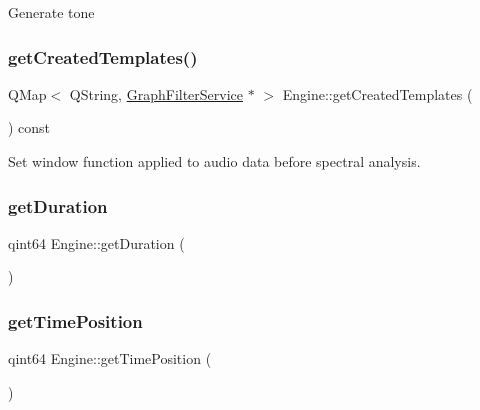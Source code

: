 Generate tone \hypertarget{class_engine_a252738800567e88de862458d94bcad15}{}\label{class_engine_a252738800567e88de862458d94bcad15} 
\subsubsection{\texorpdfstring{get\+Created\+Templates()}{getCreatedTemplates()}}
{\footnotesize\ttfamily Q\+Map$<$ Q\+String, \hyperlink{class_graph_filter_service}{Graph\+Filter\+Service} $\ast$ $>$ Engine\+::get\+Created\+Templates (\begin{DoxyParamCaption}{ }\end{DoxyParamCaption}) const}

Set window function applied to audio data before spectral analysis. \hypertarget{class_engine_a165b8efe8055b3da607db4a6bb977a0c}{}\label{class_engine_a165b8efe8055b3da607db4a6bb977a0c} 
\subsubsection{\texorpdfstring{get\+Duration}{getDuration}}
{\footnotesize\ttfamily qint64 Engine\+::get\+Duration (\begin{DoxyParamCaption}{ }\end{DoxyParamCaption})\hspace{0.3cm}{\ttfamily [slot]}}

\hypertarget{class_engine_a9861606422c32d2dcd78ca7666f43785}{}\label{class_engine_a9861606422c32d2dcd78ca7666f43785} 
\subsubsection{\texorpdfstring{get\+Time\+Position}{getTimePosition}}
{\footnotesize\ttfamily qint64 Engine\+::get\+Time\+Position (\begin{DoxyParamCaption}{ }\end{DoxyParamCaption})\hspace{0.3cm}{\ttfamily [slot]}}

\hypertarget{class_engine_a8b33312dbe69efdb8f5c311439015bc3}{}\label{class_engine_a8b33312dbe69efdb8f5c311439015bc3} 
